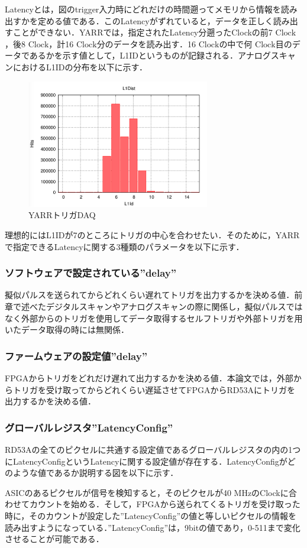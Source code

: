 Latencyとは，図のtrigger入力時にどれだけの時間遡ってメモリから情報を読み出すかを定める値である．このLatencyがずれていると，データを正しく読み出すことができない．YARRでは，指定されたLatency分遡ったClockの前7 $\mathrm{Clock}$，後8 $\mathrm{Clock}$，計16 $\mathrm{Clock}$分のデータを読み出す．16 $\mathrm{Clock}$の中で何 $\mathrm{Clock}$目のデータであるかを示す値として，L1IDというものが記録される．アナログスキャンにおけるL1IDの分布を以下に示す．\par
\begin{figure}[h]
  \centering
  \includegraphics[width=8cm]{./figure/l1dist.png}
  \caption{YARRトリガDAQ}
  \label{fig:YARRDAQ}
\end{figure}


理想的にはL1IDが7のところにトリガの中心を合わせたい．そのために，YARRで指定できるLatencyに関する3種類のパラメータを以下に示す．
\subsubsection*{ソフトウェアで設定されている''delay''}
擬似パルスを送られてからどれくらい遅れてトリガを出力するかを決める値．前章で述べたデジタルスキャンやアナログスキャンの際に関係し，擬似パルスではなく外部からのトリガを使用してデータ取得するセルフトリガや外部トリガを用いたデータ取得の時には無関係．

\subsubsection*{ファームウェアの設定値''delay''}
FPGAからトリガをどれだけ遅れて出力するかを決める値．本論文では，外部からトリガを受け取ってからどれくらい遅延させてFPGAからRD53Aにトリガを出力するかを決める値．

\subsubsection*{グローバルレジスタ''LatencyConfig''}
RD53Aの全てのピクセルに共通する設定値であるグローバルレジスタの内の1つにLatencyConfigというLatencyに関する設定値が存在する．LatencyConfigがどのような値であるか説明する図を以下に示す．\par
ASICのあるピクセルが信号を検知すると，そのピクセルが40 $\mathrm{MHz}$のClockに合わせてカウントを始める．そして，FPGAから送られてくるトリガを受け取った時に，そのカウントが設定した''LatencyConfig''の値と等しいピクセルの情報を読み出すようになっている．''LatencyConfig''は，9bitの値であり，0-511まで変化させることが可能である．

